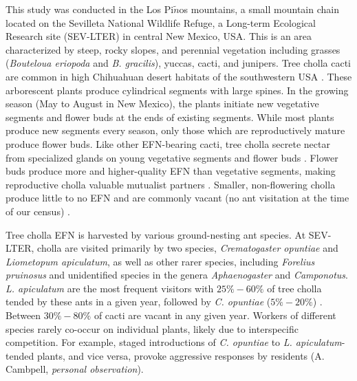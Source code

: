 \documentclass[11pt]{article}
\begin{document}
This study was conducted in the Los Pi$\tilde{n}$os mountains, a small mountain chain located on the Sevilleta National Wildlife Refuge, a Long-term Ecological Research site (SEV-LTER) in central New Mexico, USA.
This is an area characterized by steep, rocky slopes, and perennial vegetation including grasses (\textit{Bouteloua eriopoda} and \textit{B. gracilis}), yuccas, cacti, and junipers. 
Tree cholla cacti are common in high Chihuahuan desert habitats of the southwestern USA \citep{Benson1982}. 
These arborescent plants produce cylindrical segments with large spines. 
In the growing season (May to August in New Mexico), the plants initiate new vegetative segments and flower buds at the ends of existing segments. 
While most plants produce new segments every season, only those which are reproductively mature produce flower buds. 
Like other EFN-bearing cacti, tree cholla secrete nectar from specialized glands on young vegetative segments and flower buds \citep{Ness2006,Oliveira1999}. 
Flower buds produce more and higher-quality EFN than vegetative segments, making reproductive cholla valuable mutualist partners \citep{Miller2014}. 
Smaller, non-flowering cholla produce little to no EFN and are commonly vacant (no ant visitation at the time of our census) \citep{Miller2014}. 

Tree cholla EFN is harvested by various ground-nesting ant species. 
At SEV-LTER, cholla are visited primarily by two species, \textit{Crematogaster opuntiae} and \textit{Liometopum apiculatum}, as well as other rarer species, including \textit{Forelius pruinosus} and unidentified species in the genera \textit{Aphaenogaster} and \textit{Camponotus}.
\textit{L. apiculatum} are the most frequent visitors with $25\% - 60\%$ of tree cholla tended by these ants in a given year, followed by \textit{C. opuntiae} ($5\% - 20\%$) \citep{Donald2022}. 
Between $ 30\% - 80\%$ of cacti are vacant in any given year. 
Workers of different species rarely co-occur on individual plants, likely due to interspecific competition. 
For example, staged introductions of \textit{C. opuntiae} to \textit{L. apiculatum}-tended plants, and vice versa, provoke aggressive responses by residents (A. Cambpell, \textit{personal observation}).
\end{document}
